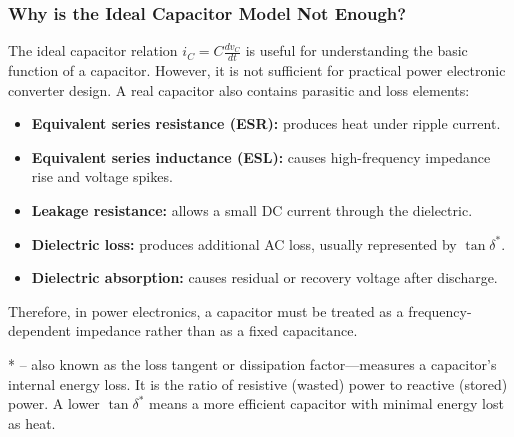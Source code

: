 \begin{frame}
\frametitle{Why is the Ideal Capacitor Model Not Enough?}
The ideal capacitor relation $i_C = C\frac{dv_C}{dt}$ is useful for understanding the basic function of a capacitor. However, it is not sufficient for practical power electronic converter design. A real capacitor also contains parasitic and loss elements:

\begin{itemize}
    \item \textbf{Equivalent series resistance (ESR):} produces heat under ripple current.
    \item \textbf{Equivalent series inductance (ESL):} causes high-frequency impedance rise and voltage spikes.
    \item \textbf{Leakage resistance:} allows a small DC current through the dielectric.
    \item \textbf{Dielectric loss:} produces additional AC loss, usually represented by $\tan\delta^*$.
    \item \textbf{Dielectric absorption:} causes residual or recovery voltage after discharge.
\end{itemize}

Therefore, in power electronics, a capacitor must be treated as a frequency-dependent impedance rather than as a fixed capacitance.

\small
* -- also known as the loss tangent or dissipation factor—measures a capacitor's internal energy loss. It is the ratio of resistive (wasted) power to reactive (stored) power. A lower $\tan\delta^*$ means a more efficient capacitor with minimal energy lost as heat.
\end{frame}


